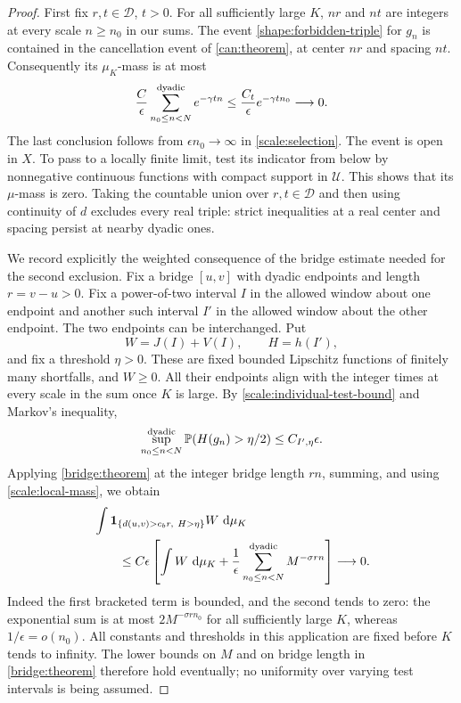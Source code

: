 \begin{proof}
First fix $r,t\in\mathcal D$, $t>0$.  For all sufficiently large $K$,
$nr$ and $nt$ are integers at every scale $n\ge n_0$ in our sums.
The event \cref{shape:forbidden-triple} for $g_n$ is contained in the
cancellation event of \cref{can:theorem}, at center $nr$ and spacing
$nt$.  Consequently its $\mu_K$-mass is at most
\[
 \frac{C}{\epsilon}\sum_{n_0\le n<N}^{\rm dyadic}
 e^{-\gamma tn}
 \le \frac{C_t}{\epsilon}e^{-\gamma t n_0}\longrightarrow0.
\]
The last conclusion follows from $\epsilon n_0\to\infty$ in
\cref{scale:selection}.  The event is open in $X$.  To pass to a locally
finite limit, test its indicator from below by nonnegative continuous
functions with compact support in $\mathcal U$.  This shows that its
$\mu$-mass is zero.  Taking the countable union over $r,t\in\mathcal D$
and then using continuity of $d$ excludes every real triple: strict
inequalities at a real center and spacing persist at nearby dyadic ones.

We record explicitly the weighted consequence of the bridge estimate
needed for the second exclusion.  Fix a bridge $[u,v]$ with dyadic
endpoints and length $r=v-u>0$.  Fix a power-of-two interval $I$ in the
allowed window about one endpoint and another such interval $I'$ in the
allowed window about the other endpoint.  The two endpoints can be
interchanged.  Put
\[
 W=J(I)+V(I),\qquad H=h(I'),
\]
and fix a threshold $\eta>0$.  These are fixed bounded Lipschitz
functions of finitely many shortfalls, and $W\ge0$.  All their endpoints
align with the integer times at every scale in the sum once $K$ is large.
By \cref{scale:individual-test-bound} and Markov's inequality,
\[
 \sup_{n_0\le n<N}^{\rm dyadic}\mathbb{P}(H(g_n)>\eta/2)
 \le C_{I',\eta}\epsilon.
\]
Applying \cref{bridge:theorem} at the integer bridge length $rn$, summing,
and using \cref{scale:local-mass}, we obtain
\begin{align}
 &\int \mathbf{1}_{\{d(u,v)>c_b r,\ H>\eta\}}W\,\,\mathrm{d}\mu_K
 \nonumber\\
 &\qquad\le C\epsilon\left[
       \int W\,\,\mathrm{d}\mu_K+
       \frac1\epsilon\sum_{n_0\le n<N}^{\rm dyadic}
                              M^{-\sigma rn}\right]
 \longrightarrow0.\label{shape:weighted-bridge}
\end{align}
Indeed the first bracketed term is bounded, and the second tends to zero:
the exponential sum is at most $2M^{-\sigma r n_0}$ for all sufficiently
large $K$, whereas $1/\epsilon=o(n_0)$.  All constants and thresholds in
this application are fixed before $K$ tends to infinity.  The lower bounds
on $M$ and on bridge length in \cref{bridge:theorem} therefore hold
eventually; no uniformity over varying test intervals is being assumed.


\end{proof}
